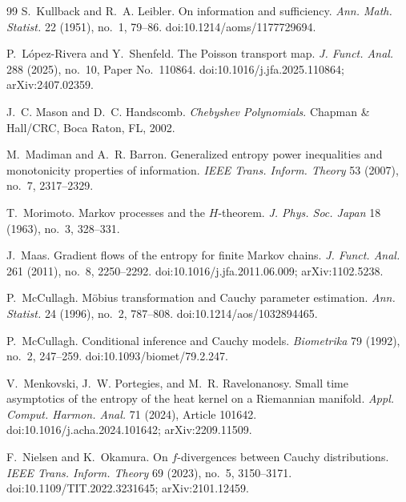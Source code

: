 \documentclass[11pt,reqno]{amsart}
\theoremstyle{plain}
\theoremstyle{definition}
\numberwithin{equation}{section}
\begin{document}
\begin{thebibliography}{99}
S.~Kullback and R.~A. Leibler.
\newblock On information and sufficiency.
\newblock \emph{Ann. Math. Statist.} 22 (1951), no.~1, 79--86.
\newblock doi:10.1214/aoms/1177729694.

P.~L{\'o}pez-Rivera and Y.~Shenfeld.
\newblock The Poisson transport map.
\newblock \emph{J. Funct. Anal.} 288 (2025), no.~10, Paper No.~110864.
\newblock doi:10.1016/j.jfa.2025.110864; arXiv:2407.02359.

J.~C. Mason and D.~C. Handscomb.
\newblock \emph{Chebyshev Polynomials}.
\newblock Chapman \& Hall/CRC, Boca Raton, FL, 2002.

M.~Madiman and A.~R. Barron.
\newblock Generalized entropy power inequalities and monotonicity properties
of information.
\newblock \emph{IEEE Trans. Inform. Theory} 53 (2007), no.~7, 2317--2329.

T.~Morimoto.
\newblock Markov processes and the \(H\)-theorem.
\newblock \emph{J. Phys. Soc. Japan} 18 (1963), no.~3, 328--331.

J.~Maas.
\newblock Gradient flows of the entropy for finite Markov chains.
\newblock \emph{J. Funct. Anal.} 261 (2011), no.~8, 2250--2292.
\newblock doi:10.1016/j.jfa.2011.06.009; arXiv:1102.5238.

P.~McCullagh.
\newblock M{\"o}bius transformation and Cauchy parameter estimation.
\newblock \emph{Ann. Statist.} 24 (1996), no.~2, 787--808.
\newblock doi:10.1214/aos/1032894465.

P.~McCullagh.
\newblock Conditional inference and Cauchy models.
\newblock \emph{Biometrika} 79 (1992), no.~2, 247--259.
\newblock doi:10.1093/biomet/79.2.247.

V.~Menkovski, J.~W. Portegies, and M.~R. Ravelonanosy.
\newblock Small time asymptotics of the entropy of the heat kernel on a
{R}iemannian manifold.
\newblock \emph{Appl. Comput. Harmon. Anal.} 71 (2024), Article 101642.
\newblock doi:10.1016/j.acha.2024.101642; arXiv:2209.11509.

F.~Nielsen and K.~Okamura.
\newblock On {$f$}-divergences between Cauchy distributions.
\newblock \emph{IEEE Trans. Inform. Theory} 69 (2023), no.~5, 3150--3171.
\newblock doi:10.1109/TIT.2022.3231645; arXiv:2101.12459.


\end{thebibliography}
\end{document}
